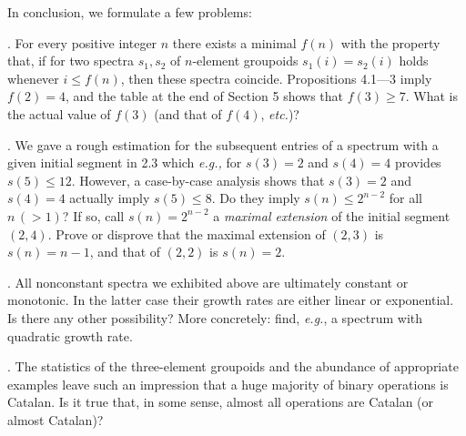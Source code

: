 \documentclass[a4paper,reqno]{amsart}\usepackage{amssymb,latexsym}
\theoremstyle{definition}
\theoremstyle{remark}
\numberwithin{equation}{section}
\numberwithin{theorem}{section}
\begin{document}
\medskip

In conclusion, we formulate a few problems:

\smallskip

. For every positive integer $n$ there exists a minimal $f(n)$ with
the property that, if for two spectra $s_{1},s_{2}$ of $n$-element groupoids
$s_{1}(i)=s_{2}(i)$ holds whenever $i\leq f(n)$, then these spectra coincide.
Propositions 4.1---3 imply $f(2)=4$, and the table at the end of Section 5
shows that $f(3)\geq7$. What is the actual value of $f(3)$ (and that of
$f(4)$, \textit{etc.})?

\smallskip

. We gave a rough estimation for the subsequent entries of a
spectrum with a given initial segment in 2.3 which \textit{e.g.,} for $s(3)=2
$ and $s(4)=4$ provides $s(5)\leq12$. However, a case-by-case analysis shows
that $s(3)=2$ and $s(4)=4$ actually imply $s(5)\leq8$. Do they imply
$s(n)\leq2^{n-2}$ for all $n\,(>1)$\thinspace? If so, call $s(n)=2^{n-2}$ a
\textit{maximal extension} of the initial segment $(2,4)$. Prove or disprove
that the maximal extension of $(2,3)$ is $s(n)=n-1$, and that of $(2,2)$ is
$s(n)=2$.

\smallskip

. All nonconstant spectra we exhibited above are ultimately constant
or monotonic. In the latter case their growth rates are either linear or
exponential. Is there any other possibility? More concretely: find,
\textit{e.g.}, a spectrum with quadratic growth rate.

\smallskip

. The statistics of the three-element groupoids and the abundance of
appropriate examples leave such an impression that a huge majority of binary
operations is Catalan. Is it true that, in some sense, almost all operations
are Catalan (or almost Catalan)?
\end{document}
